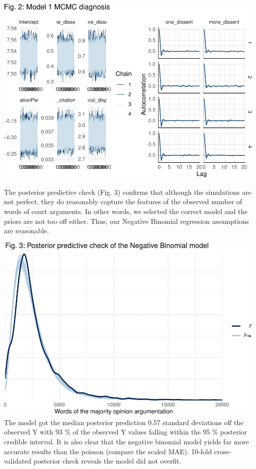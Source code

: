 \documentclass[
  11pt,
]{article}
\begin{document}
\vspace{25pt}

\includegraphics{dissents_article_appendix_files/figure-latex/model1_diagnosis-1.pdf}
\vspace{25pt}

The posterior predictive check (Fig. 3) confirms that although the
simulations are not perfect, they do reasonably capture the features of
the observed number of words of court arguments. In other words, we
selected the correct model and the priors are not too off either. Thus,
our Negative Binomial regression assumptions are reasonable.

\vspace{25pt}

\includegraphics{dissents_article_appendix_files/figure-latex/pp_check_negbinom-1.pdf}
\vspace{25pt} The model got the median posterior prediction 0.57
standard deviations off the observed Y with 93 \% of the observed Y
values falling within the 95 \% posterior credible interval. It is also
clear that the negative binomial model yields far more accurate results
than the poisson (compare the scaled MAE). 10-fold cross-validated
posterior check reveals the model did not overfit.
\end{document}
